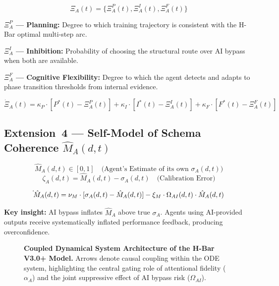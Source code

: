\documentclass[11pt,a4paper]{article}
\begin{document}
\begin{equation}\label{eq:executive-state}
\Xi_A(t) = \{\Xi_A^P(t), \Xi_A^I(t), \Xi_A^F(t)\}
\end{equation}

\textbf{$\Xi_A^P$ --- Planning:} Degree to which training trajectory is
consistent with the H-Bar optimal multi-step arc.

\textbf{$\Xi_A^I$ --- Inhibition:} Probability of choosing the structural
route over AI bypass when both are available.

\textbf{$\Xi_A^F$ --- Cognitive Flexibility:} Degree to which the agent
detects and adapts to phase transition thresholds from internal evidence.

\begin{equation}\label{eq:executive-ode}
\dot{\Xi}_A(t) = \kappa_P \cdot [P^*(t) - \Xi_A^P(t)] + \kappa_I \cdot [I^*(t) - \Xi_A^I(t)] + \kappa_F \cdot [F^*(t) - \Xi_A^F(t)]
\end{equation}

\subsection{Extension~4 --- Self-Model of Schema Coherence \texorpdfstring{$\hat M_A(d,t)$}{M-hat\_A(d,t)}}\label{sec:metacognition}

\begin{equation}\label{eq:self-model}
\hat{M}_A(d,t) \in [0,1] \quad \text{(Agent's Estimate of its own } \sigma_A(d,t))
\end{equation}
\begin{equation}\label{eq:calibration-error}
\zeta_A(d,t) = \hat{M}_A(d,t) - \sigma_A(d,t) \quad \text{(Calibration Error)}
\end{equation}

\begin{equation}\label{eq:self-model-ode}
\dot{\vphantom{M}}\hat{M}_A(d,t) = \nu_M \cdot [\sigma_A(d,t) - \hat{M}_A(d,t)] - \xi_M \cdot \Omega_{AI}(d,t) \cdot \hat{M}_A(d,t)
\end{equation}

\textbf{Key insight:} AI bypass inflates $\hat M_A$ above true
$\sigma_A$. Agents using AI-provided outputs receive systematically
inflated performance feedback, producing overconfidence.

\begin{figure}[htbp]
\centering
\resizebox{0.9\textwidth}{!}{}
\caption{\textbf{Coupled Dynamical System Architecture of the H-Bar
V3.0+ Model.} Arrows denote causal coupling within the ODE system,
highlighting the central gating role of attentional fidelity ($\alpha_A$)
and the joint suppressive effect of AI bypass risk ($\Omega_{AI}$).}
\label{fig:coupled-system}
\end{figure}
\end{document}
